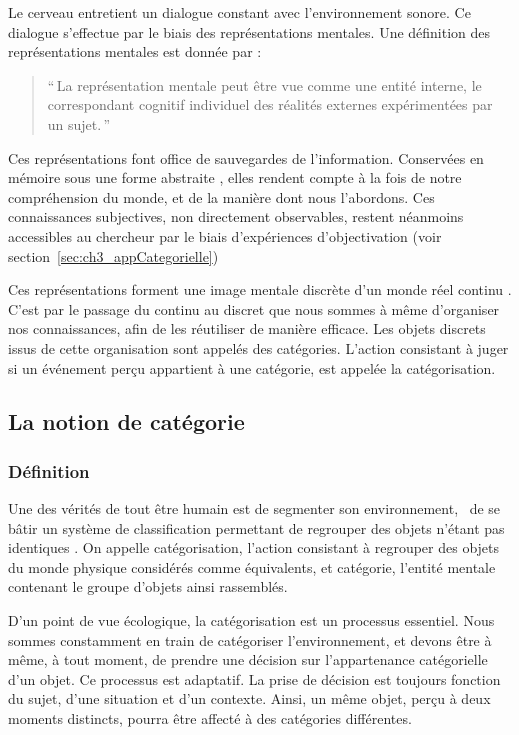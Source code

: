 Le cerveau entretient un dialogue constant avec l'environnement sonore. Ce dialogue s'effectue par le biais des représentations mentales. Une définition des représentations mentales est donnée par \citep{houde1998vocabulaire}:

\begin{quote}
``\,La représentation mentale peut être vue comme une entité interne, le correspondant cognitif individuel des réalités externes expérimentées par un sujet.\,''
\end{quote}

Ces représentations font office de sauvegardes de l'information. Conservées en mémoire sous une forme abstraite \citep[p. 357]{mcadams1994penser}, elles rendent compte à la fois de notre compréhension du monde, et de la manière dont nous l'abordons. Ces connaissances subjectives, non directement observables, restent néanmoins accessibles au chercheur par le biais d'expériences d'objectivation (voir section~\ref{sec:ch3_appCategorielle})
 
Ces représentations forment une image mentale discrète d'un monde réel continu \citep{houde1998vocabulaire}. C'est par le passage du continu au discret que nous sommes à même d'organiser nos connaissances, afin de les réutiliser de manière efficace. Les objets discrets issus de cette organisation sont appelés des catégories. L'action consistant à juger si un événement perçu appartient à une catégorie, est appelée la catégorisation.

\subsection{La notion de catégorie}

\subsubsection{Définition}

Une des vérités de tout être humain est de segmenter son environnement, \ie~de se bâtir un système de classification permettant de regrouper des objets n'étant pas identiques \citep[p. 1]{rosch1978cognition}. On appelle catégorisation, l'action consistant à regrouper des objets du monde physique considérés comme équivalents, et catégorie, l'entité mentale contenant le groupe d'objets ainsi rassemblés. 
 
D'un point de vue écologique, la catégorisation est un processus essentiel. Nous sommes constamment en train de catégoriser l'environnement, et devons être à même, à tout moment, de prendre une décision sur l'appartenance catégorielle d'un objet. Ce processus est adaptatif. La prise de décision est toujours fonction du sujet, d'une situation et d'un contexte. Ainsi, un même objet, perçu à deux moments distincts, pourra être affecté à des catégories différentes. 


